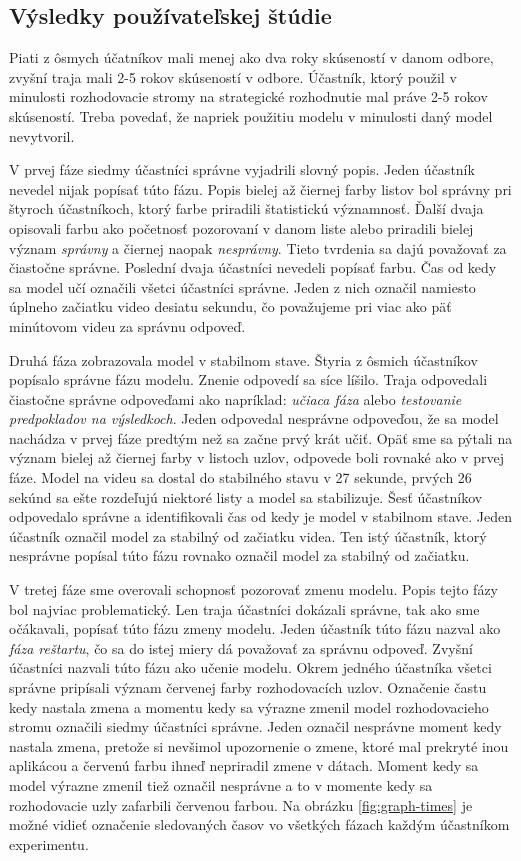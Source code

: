 

\subsection{Výsledky používateľskej štúdie}
Piati z ôsmych účatníkov mali menej ako dva roky skúseností v danom odbore, zvyšní traja mali 2-5 rokov skúseností v odbore. Účastník, ktorý použil v minulosti rozhodovacie stromy na strategické rozhodnutie mal práve 2-5 rokov skúseností. Treba povedať, že napriek použitiu modelu v minulosti daný model nevytvoril.
\par
V prvej fáze siedmy účastníci správne vyjadrili slovný popis. Jeden účastník nevedel nijak popísať túto fázu. Popis bielej až čiernej farby listov bol správny pri štyroch účastníkoch, ktorý farbe priradili štatistickú významnosť. Ďalší dvaja opisovali farbu ako početnosť pozorovaní v danom liste alebo priradili bielej význam \textit{správny} a čiernej naopak \textit{nesprávny}. Tieto tvrdenia sa dajú považovať za čiastočne správne. Poslední dvaja účastníci nevedeli popísať farbu. Čas od kedy sa model učí označili všetci účastníci správne. Jeden z nich označil namiesto úplneho začiatku video desiatu sekundu, čo považujeme pri viac ako päť minútovom videu za správnu odpoveď.
\par
Druhá fáza zobrazovala model v stabilnom stave. Štyria z ôsmich účastníkov popísalo správne fázu modelu. Znenie odpovedí sa síce líšilo. Traja odpovedali čiastočne správne odpoveďami ako napríklad: \textit{učiaca fáza} alebo \textit{testovanie predpokladov na výsledkoch}. Jeden odpovedal nesprávne odpoveďou, že sa model nachádza v prvej fáze predtým než sa začne prvý krát učiť. Opäť sme sa pýtali na význam bielej až čiernej farby v listoch uzlov, odpovede boli rovnaké ako v prvej fáze. Model na videu sa dostal do stabilného stavu v 27 sekunde, prvých 26 sekúnd sa ešte rozdeľujú niektoré listy a model sa stabilizuje. Šesť účastníkov odpovedalo správne a identifikovali čas od kedy je model v stabilnom stave. Jeden účastník označil model za stabilný od začiatku videa. Ten istý účastník, ktorý nesprávne popísal túto fázu rovnako označil model za stabilný od začiatku.
\par
V tretej fáze sme overovali schopnosť pozorovať zmenu modelu. Popis tejto fázy bol najviac problematický. Len traja účastníci dokázali správne, tak ako sme očákavali, popísať túto fázu zmeny modelu. Jeden účastník túto fázu nazval ako \textit{fáza reštartu}, čo sa do istej miery dá považovať za správnu odpoveď. Zvyšní účastníci nazvali túto fázu ako učenie modelu. Okrem jedného účastníka všetci správne pripísali význam červenej farby rozhodovacích uzlov. Označenie častu kedy nastala zmena a momentu kedy sa výrazne zmenil model rozhodovacieho stromu označili siedmy účastníci správne. Jeden označil nesprávne moment kedy nastala zmena, pretože si nevšimol upozornenie o zmene, ktoré mal prekryté inou aplikácou a červenú farbu ihneď nepriradil zmene v dátach. Moment kedy sa model výrazne zmenil tiež označil nesprávne a to v momente kedy sa rozhodovacie uzly zafarbili červenou farbou. Na obrázku \ref{fig:graph-times} je možné vidieť označenie sledovaných časov vo všetkých fázach každým účastníkom experimentu.
